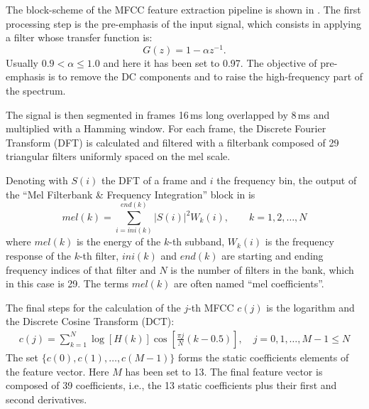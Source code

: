 The block-scheme of the MFCC feature extraction pipeline is shown in . The first processing step is the pre-emphasis of the input signal, which consists in applying a filter whose transfer function is:
\begin{equation}
G(z) = 1 - \alpha z^{-1}.
\end{equation}
Usually $0.9<\alpha\leq1.0$ and here it has been set to 0.97. The objective of pre-emphasis is to remove the DC components and to raise the high-frequency part of the spectrum.

The signal is then segmented in frames 16\,ms long overlapped by 8\,ms and multiplied with a Hamming window. For each frame, the Discrete Fourier Transform (DFT) is calculated and filtered with a filterbank composed of 29 triangular filters uniformly spaced on the mel scale. 

Denoting with $S(i)$ the DFT of a frame and $i$ the frequency bin, the output of the ``Mel Filterbank \& Frequency Integration'' block in  is
\begin{equation}
mel(k) = \sum_{i=ini(k)}^{end(k)}|S(i)|^2 W_k(i), \qquad k=1,2,\ldots,N
\end{equation}
where $mel(k)$ is the energy of the $k$-th subband, $W_k(i)$ is the frequency response of the $k$-th filter, $ini(k)$ and $end(k)$ are starting and ending frequency indices of that filter and $N$ is the number of filters in the bank, which in this case is 29. The terms $mel(k)$ are often named ``mel coefficients''.

The final steps for the calculation of the $j$-th MFCC $c(j)$ is the logarithm and the Discrete Cosine Transform (DCT):
\begin{equation}
\begin{aligned}
c(j) = \sum_{k=1}^{N}\log \left[ H(k)\right] \cos\left[\frac{\pi j}{N}(k-0.5)\right], \quad j=0,1,\ldots,M-1\leq N
\end{aligned}
\end{equation}
The set $\{c(0),c(1),\ldots,c(M-1)\}$ forms the static coefficients elements of the feature vector. Here $M$ has been set to 13. The final feature vector is composed of 39 coefficients, i.e., the 13 static coefficients plus their first and second derivatives. %


